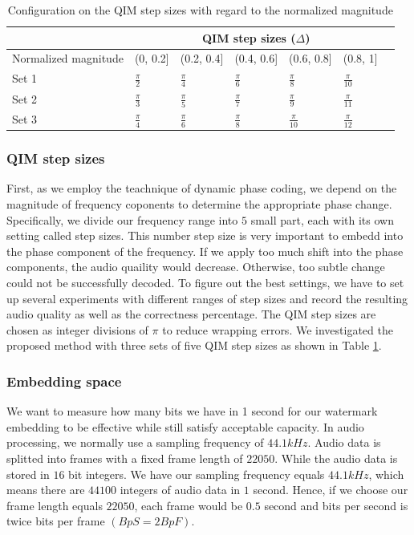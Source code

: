 \begin{table}
\centering
\caption{Configuration on the QIM step sizes with regard to the normalized magnitude}
\vspace{2mm}
\addtolength{\tabcolsep}{-6pt}
\begin{tabular}{|m{3cm}|m{2.25cm} | m{2.25cm} | m{2.25cm} | m{2.25cm} | m{2.25cm} m{0cm}|}
 \hline 
& \multicolumn{5}{c}{QIM step sizes ($\Delta$)} & \\ [.2cm]
\hline
Normalized magnitude & (0, 0.2] & (0.2, 0.4] & (0.4, 0.6] & (0.6, 0.8] & (0.8, 1] & \\
\hline
Set 1 & $\tfrac{\pi}{2}$ & $\frac{\pi}{4}$ & $\frac{\pi}{6}$ & $\frac{\pi}{8}$ & $\frac{\pi}{10}$ & \\ [.2cm]
\hline
Set 2 & $\tfrac{\pi}{3}$ & $\frac{\pi}{5}$ & $\frac{\pi}{7}$ & $\frac{\pi}{9}$ & $\frac{\pi}{11}$ & \\ [.2cm]
\hline
Set 3 & $\tfrac{\pi}{4}$ & $\frac{\pi}{6}$ & $\frac{\pi}{8}$ & $\frac{\pi}{10}$ & $\frac{\pi}{12}$ & \\ [.2cm]
\hline
\end{tabular}
\addtolength{\tabcolsep}{6pt}
\label{tab:QIMStep}
\end{table}

\subsubsection{QIM step sizes}First, as we employ the teachnique of dynamic phase coding, we depend on the magnitude of frequency coponents to determine the appropriate phase change. Specifically, we divide our frequency range into \(5\) small part, each with its own setting called step sizes. This number step size is very important to embedd into the phase component of the frequency. If we apply too much shift into the phase components, the audio quaility would decrease. Otherwise, too subtle change could not be successfully decoded. To figure out the best settings, we have to set up several experiments with different ranges of step sizes and record the resulting audio quality as well as the correctness percentage. The QIM step sizes are chosen as integer divisions of \(\pi\)
to reduce wrapping errors. We investigated the proposed method with three sets of five
QIM step sizes as shown in Table \ref{tab:QIMStep}.
\subsubsection{Embedding space}
We want to measure how many bits we have in 1 second for our watermark embedding to be effective while still satisfy acceptable capacity. In audio processing, we normally use a sampling frequency of \(44.1kHz\). Audio data is splitted into frames with a fixed frame length of \(22050\). While the audio data is stored in \(16\) bit integers. We have our sampling frequency equals \(44.1kHz\), which means there are \(44100\) integers of audio data in \(1\) second. Hence, if we choose our frame length equals \(22050\), each frame would be \(0.5\) second and bits per second is twice bits per frame \((BpS=2BpF)\). 

